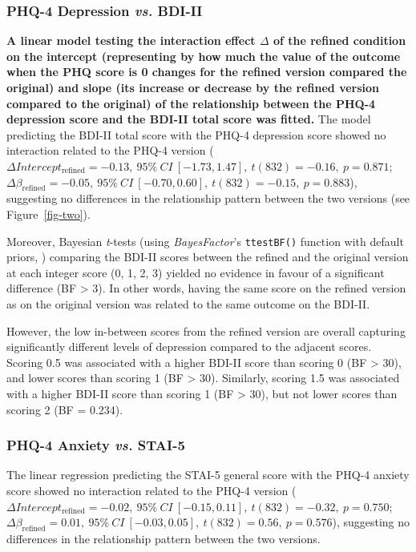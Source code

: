 \documentclass[
  jou,
  longtable,
  nolmodern,
  notxfonts,
  notimes,
  mask,
  colorlinks=true,linkcolor=blue,citecolor=blue,urlcolor=blue]{apa7}
\begin{document}
\subsubsection{\texorpdfstring{PHQ-4 Depression \emph{vs.}
BDI-II}{PHQ-4 Depression vs. BDI-II}}\label{phq-4-depression-vs.-bdi-ii}

\textbf{A linear model testing the interaction effect \(\Delta\) of the
refined condition on the intercept (representing by how much the value
of the outcome when the PHQ score is 0 changes for the refined version
compared the original) and slope (its increase or decrease by the
refined version compared to the original) of the relationship between
the PHQ-4 depression score and the BDI-II total score was fitted.} The
model predicting the BDI-II total score with the PHQ-4 depression score
showed no interaction related to the PHQ-4 version
(\(\Delta Intercept_{\text{refined}} =  -0.13,~95\%~CI~[-1.73, 1.47],~t(832) =  -0.16,~p = 0.871\);
\(\Delta \beta_{\text{refined}} = -0.05,~95\%~CI~[-0.70, 0.60],~t(832) = -0.15,~p = 0.883\)),
suggesting no differences in the relationship pattern between the two
versions (see Figure~\ref{fig-two}).

Moreover, Bayesian \emph{t}-tests (using \emph{BayesFactor}'s
\texttt{ttestBF()} function with default priors,
) comparing the
BDI-II scores between the refined and the original version at each
integer score (0, 1, 2, 3) yielded no evidence in favour of a
significant difference (BF \textgreater{} 3). In other words, having the
same score on the refined version as on the original version was related
to the same outcome on the BDI-II.

However, the low in-between scores from the refined version are overall
capturing significantly different levels of depression compared to the
adjacent scores. Scoring 0.5 was associated with a higher BDI-II score
than scoring 0 (BF \textgreater{} 30), and lower scores than scoring 1
(BF \textgreater{} 30). Similarly, scoring 1.5 was associated with a
higher BDI-II score than scoring 1 (BF \textgreater{} 30), but not lower
scores than scoring 2 (BF = 0.234).

\subsubsection{\texorpdfstring{PHQ-4 Anxiety \emph{vs.}
STAI-5}{PHQ-4 Anxiety vs. STAI-5}}\label{phq-4-anxiety-vs.-stai-5}

The linear regression predicting the STAI-5 general score with the PHQ-4
anxiety score showed no interaction related to the PHQ-4 version
(\(\Delta Intercept_{\text{refined}} =  -0.02,~95\%~CI~[-0.15, 0.11],~t(832) =  -0.32,~p = 0.750\);
\(\Delta \beta_{\text{refined}} = 0.01,~95\%~CI~[-0.03, 0.05],~t(832) = 0.56,~p = 0.576\)),
suggesting no differences in the relationship pattern between the two
versions.
\end{document}
